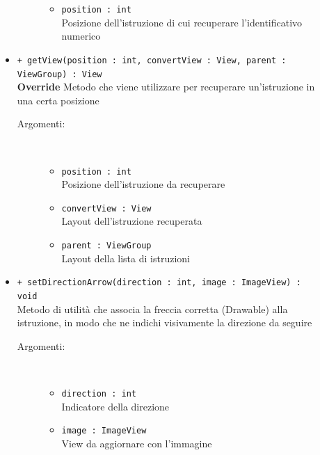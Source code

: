\documentclass[../DefinizioneDiProdotto.tex]{subfiles}
\begin{document}
\begin{description}
\begin{itemize}
\begin{description}
\begin{itemize}
				\item \texttt{position : int}\\
				Posizione dell'istruzione di cui recuperare l'identificativo numerico\end{itemize}
		\end{description}
		\item \texttt{+ getView(position : int, convertView : View, parent : ViewGroup) : View}\\
		\textbf{Override} Metodo che viene utilizzare per recuperare un'istruzione in una certa posizione
		\begin{description}
			\item[Argomenti:] \
			\begin{itemize}
				\item \texttt{position : int}\\
				Posizione dell'istruzione da recuperare\item \texttt{convertView : View}\\
				Layout dell'istruzione recuperata\item \texttt{parent : ViewGroup}\\
				Layout della lista di istruzioni\end{itemize}
		\end{description}
		\item \texttt{+ setDirectionArrow(direction : int, image : ImageView) : void}\\
		Metodo di utilità che associa la freccia corretta (Drawable) alla istruzione, in modo che ne indichi visivamente la direzione da seguire
		\begin{description}
			\item[Argomenti:] \
			\begin{itemize}
				\item \texttt{direction : int}\\
				Indicatore della direzione\item \texttt{image : ImageView}\\
				View da aggiornare con l'immagine\end{itemize}
		\end{description}
	\end{itemize}
\end{description}
\end{document}

